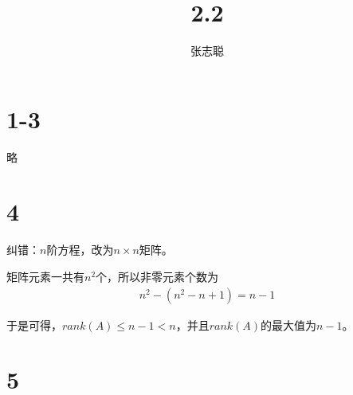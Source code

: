 \documentclass{article}
\begin{document}
\title{2.2}
\author{张志聪}
\maketitle

\section*{1-3}
略

\section*{4}

纠错：$n$阶方程，改为$n \times n$矩阵。

矩阵元素一共有$n^2$个，所以非零元素个数为
\begin{align*}
  n^2 - (n^2 - n + 1) = n - 1
\end{align*}

于是可得，$rank(A) \leq n - 1 < n$，并且$rank(A)$的最大值为$n - 1$。

\section*{5}
\end{document}
